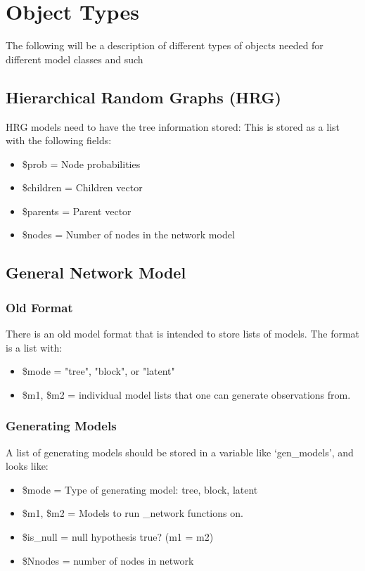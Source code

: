 \documentclass[11pt]{article}
\begin{document}
\section{Object Types}
The following will be a description of different types of objects needed for different model classes and such
\subsection{Hierarchical Random Graphs (HRG)}
HRG models need to have the tree information stored: This is stored as a list with the following fields: 
\begin{itemize}
\item \$prob = Node probabilities
\item \$children = Children vector
\item \$parents = Parent vector 
\item \$nodes = Number of nodes in the network model
\end{itemize}

\subsection{General Network Model}
\subsubsection{Old Format}
There is an old model format that is intended to store lists of models. The format is a list with: 
\begin{itemize}


\item \$mode = "tree", "block", or "latent"
\item \$m1, \$m2 = individual model lists that one can generate observations from. 
\end{itemize}

\subsubsection{Generating Models}
A list of generating models should be stored in a variable like `gen\_models', and looks like: 
\begin{itemize}
\item \$mode = Type of generating model: tree, block, latent
\item \$m1, \$m2 = Models to run \_network functions on. 
\item \$is\_null = null hypothesis true? (m1 = m2)
\item \$Nnodes = number of nodes in network 
\end{itemize}
\end{document}

